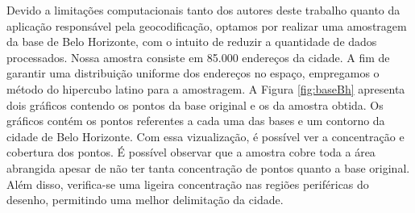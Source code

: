 Devido a limitações computacionais tanto dos autores deste trabalho quanto da aplicação responsável pela geocodificação, optamos por realizar uma amostragem da base de Belo Horizonte, com o intuito de reduzir a quantidade de dados processados. Nossa amostra consiste em 85.000 endereços da cidade. A fim de garantir uma distribuição uniforme dos endereços no espaço, empregamos o método do hipercubo latino para a amostragem. A Figura \ref{fig:baseBh} apresenta dois gráficos contendo os pontos da base original e os da amostra obtida. Os gráficos contém os pontos referentes a cada uma das bases e um contorno da cidade de Belo Horizonte. Com essa vizualização, é possível ver a concentração e cobertura dos pontos. É possível observar que a amostra cobre toda a área abrangida apesar de não ter tanta concentração de pontos quanto a base original. Além disso, verifica-se uma ligeira concentração nas regiões periféricas do desenho, permitindo uma melhor delimitação da cidade.

